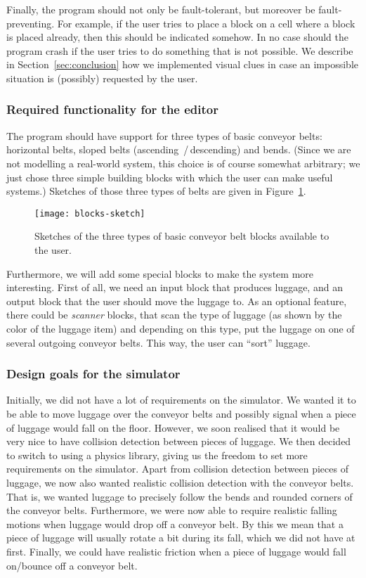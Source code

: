 Finally, the program should not only be fault-tolerant, but moreover be fault-preventing. For example, if the user tries to place a block on a cell where a block is placed already, then this should be indicated somehow. In no case should the program crash if the user tries to do something that is not possible. We describe in Section~\ref{sec:conclusion} how we implemented visual clues in case an impossible situation is (possibly) requested by the user.

\subsubsection{Required functionality for the editor}
\label{subsubsec:req-functionality-simulator}
The program should have support for three types of basic conveyor belts: horizontal belts, sloped belts (ascending \,/\,descending) and bends. (Since we are not modelling a real-world system, this choice is of course somewhat arbitrary; we just chose three simple building blocks with which the user can make useful systems.) Sketches of those three types of belts are given in Figure~\ref{fig:blocks-sketch}.
\begin{figure}
  \begin{center}
    \texttt{[image: blocks-sketch]}
    \caption{Sketches of the three types of basic conveyor belt blocks available to the user.}
    \label{fig:blocks-sketch}
  \end{center}
\end{figure}

Furthermore, we will add some special blocks to make the system more interesting. First of all, we need an input block that produces luggage, and an output block that the user should move the luggage to. As an optional feature, there could be \emph{scanner} blocks, that scan the type of luggage (as shown by the color of the luggage item) and depending on this type, put the luggage on one of several outgoing conveyor belts. This way, the user can ``sort'' luggage.

\subsubsection{Design goals for the simulator}
\label{subsubsec:design-goals-simulator}
Initially, we did not have a lot of requirements on the simulator. We wanted it to be able to move luggage over the conveyor belts and possibly signal when a piece of luggage would fall on the floor. However, we soon realised that it would be very nice to have collision detection between pieces of luggage. We then decided to switch to using a physics library, giving us the freedom to set more requirements on the simulator. Apart from collision detection between pieces of luggage, we now also wanted realistic collision detection with the conveyor belts. That is, we wanted luggage to precisely follow the bends and rounded corners of the conveyor belts. Furthermore, we were now able to require realistic falling motions when luggage would drop off a conveyor belt. By this we mean that a piece of luggage will usually rotate a bit during its fall, which we did not have at first. Finally, we could have realistic friction when a piece of luggage would fall on/bounce off a conveyor belt.

